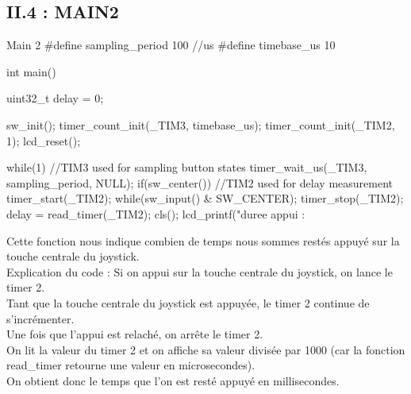 \subsection{II.4 : MAIN2}
\begin{Cpp}{Main 2} 
#define sampling_period 100         //us
#define timebase_us     10

int main()
{
    uint32_t delay = 0;
    
    sw_init();
    timer_count_init(_TIM3, timebase_us);
    timer_count_init(_TIM2, 1);
    lcd_reset();    
    
    while(1)
    {
        //TIM3 used for sampling button states
        timer_wait_us(_TIM3, sampling_period, NULL);
        if(sw_center())
        {
            //TIM2 used for delay measurement
            timer_start(_TIM2);
            while(sw_input() & SW_CENTER);
            timer_stop(_TIM2);
            delay = read_timer(_TIM2);
            cls();
            lcd_printf("duree appui : %
        }
    }        
}
\end{Cpp}

Cette fonction nous indique combien de temps nous sommes restés appuyé sur la touche centrale du joystick.\\
Explication du code :
Si on appui sur la touche centrale du joystick, on lance le timer 2.\\
Tant que la touche centrale du joystick est appuyée, le timer 2 continue de s'incrémenter.\\
Une fois que l'appui est relaché, on arrête le timer 2.\\
On lit la valeur du timer 2 et on affiche sa valeur divisée par 1000 (car la fonction read\_timer retourne une valeur en microsecondes).\\ On obtient donc le temps que l'on est resté appuyé en millisecondes. 



\newpage
